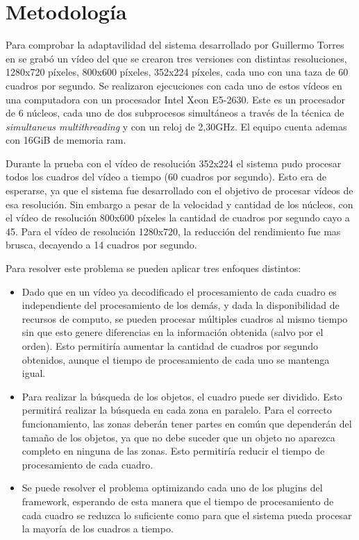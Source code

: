 
\section{Metodología}

Para comprobar la adaptavilidad del sistema desarrollado por Guillermo Torres en
\cite{torres2014} se grabó un vídeo del que se crearon tres versiones con
distintas resoluciones, 1280x720 píxeles, 800x600 píxeles, 352x224 píxeles, cada
uno con una taza de 60 cuadros por segundo. Se realizaron ejecuciones con cada
uno de estos vídeos en una computadora con un procesador Intel Xeon E5-2630.
Este es un procesador de 6 núcleos, cada uno de dos subprocesos simultáneos a
través de la técnica de \emph{simultaneus multithreading} y con un reloj de
2,30GHz. El equipo cuenta ademas con 16GiB de memoria ram.

Durante la prueba con el vídeo de resolución 352x224 el sistema pudo procesar
todos los cuadros del vídeo a tiempo (60 cuadros por segundo). Esto era de
esperarse, ya que el sistema fue desarrollado con el objetivo de procesar vídeos
de esa resolución. Sin embargo a pesar de la velocidad y cantidad de los
núcleos, con el vídeo de resolución 800x600 píxeles la cantidad de cuadros por
segundo cayo a 45. Para el vídeo de resolución 1280x720, la reducción del
rendimiento fue mas brusca, decayendo a 14 cuadros por segundo.

Para resolver este problema se pueden aplicar tres enfoques distintos:

\begin{itemize}

\item 	Dado que en un vídeo ya decodificado el procesamiento de cada cuadro es
	independiente del procesamiento de los demás, y dada la disponibilidad
	de recursos de computo, se pueden procesar múltiples cuadros al mismo
	tiempo sin que esto genere diferencias en la información obtenida (salvo
	por el orden). Esto permitiría aumentar la cantidad de cuadros por
	segundo obtenidos, aunque el tiempo de procesamiento de cada uno se
	mantenga igual.

\item	Para realizar la búsqueda de los objetos, el cuadro puede ser dividido.
	Esto permitirá realizar la búsqueda en cada zona en paralelo. Para el
	correcto funcionamiento, las zonas deberán tener partes en común que
	dependerán del tamaño de los objetos, ya que no debe suceder que un
	objeto no aparezca completo en ninguna de las zonas. Esto permitiría
	reducir el tiempo de procesamiento de cada cuadro.

\item	Se puede resolver el problema optimizando cada uno de los plugins del
	framework, esperando de esta manera que el tiempo de procesamiento de
	cada cuadro se reduzca lo suficiente como para que el sistema pueda
	procesar la mayoría de los cuadros a tiempo.

\end{itemize}

